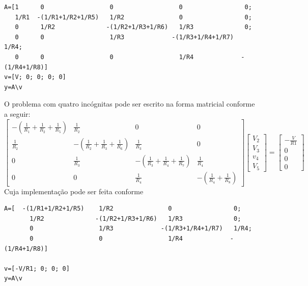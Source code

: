\begin{Answer}
\begin{verbatim}
A=[1      0                  0                  0                 0;
   1/R1  -(1/R1+1/R2+1/R5)   1/R2               0                 0;
   0      1/R2              -(1/R2+1/R3+1/R6)   1/R3              0;
   0      0                  1/R3             -(1/R3+1/R4+1/R7)   1/R4;
   0      0                  0                  1/R4             -(1/R4+1/R8)]
v=[V; 0; 0; 0; 0]
y=A\v
\end{verbatim}
O problema com quatro incógnitas pode ser escrito na forma matricial conforme a seguir:
$$\left[\begin{array}{cccc}
-\left(\frac{1}{R_1}+\frac{1}{R_2}+\frac{1}{R_5}\right)&\frac{1}{R_2}&0&0\\[.5cm]
\frac{1}{R_2}&-\left(\frac{1}{R_2}+\frac{1}{R_3}+\frac{1}{R_6}\right)&\frac{1}{R_3}&0\\[.5cm]
0&\frac{1}{R_3}&-\left(\frac{1}{R_3}+\frac{1}{R_4}+\frac{1}{R_7}\right)&\frac{1}{R_4}\\[.5cm]
0&0&\frac{1}{R_4}&-\left(\frac{1}{R_4}+\frac{1}{R_8}\right)
\end{array}
\right]
\left[\begin{array}{c}
V_2\\[.65cm]
V_3\\[.65cm]
v_4\\[.65cm]
V_5
\end{array}
\right]=
\left[\begin{array}{c}
-\frac{V}{R1}\\[.65cm]
0\\[.65cm]
0\\[.65cm]
0
\end{array}
\right] $$
Cuja implementação pode ser feita conforme
\begin{verbatim}
A=[  -(1/R1+1/R2+1/R5)    1/R2               0                 0;
       1/R2              -(1/R2+1/R3+1/R6)   1/R3              0;
       0                  1/R3             -(1/R3+1/R4+1/R7)   1/R4;
       0                  0                  1/R4             -(1/R4+1/R8)]

v=[-V/R1; 0; 0; 0]
y=A\v
\end{verbatim}
\end{Answer}
\fi

